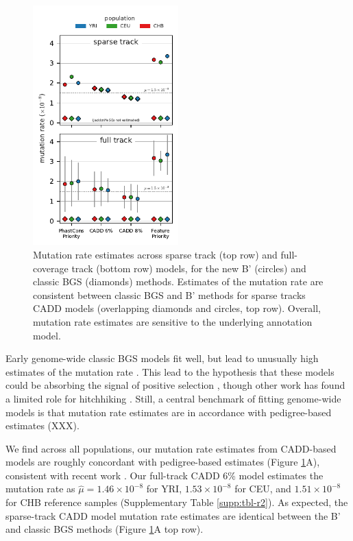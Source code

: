 \documentclass[11pt]{article}
\begin{document}
\begin{figure}[htbp] 
    \centering
    \includegraphics[width=0.5\textwidth]{figures/figure_5.pdf} 
    
    \caption{Mutation rate estimates across sparse track (top row) and
        full-coverage track (bottom row) models, for the new B' (circles) and
        classic BGS (diamonds) methods. Estimates of the mutation rate are
        consistent between classic BGS and B' methods for sparse tracks CADD
        models (overlapping diamonds and circles, top row). Overall, mutation
        rate estimates are sensitive to the underlying annotation model.}
  \label{fig:figure-4}
\end{figure}

Early genome-wide classic BGS models fit well, but lead to unusually high
estimates of the mutation rate \parencite{McVicker2009-ax}. This lead to the
hypothesis that these models could be absorbing the signal of positive
selection \parencite{Enard2014-kz}, though other work has found a limited role
for hitchhiking \parencite{Pickrell2009-tt,Hernandez2011-gs,Murphy2022}. Still,
a central benchmark of fitting genome-wide models is that mutation rate
estimates are in accordance with pedigree-based estimates (XXX). 

We find across all populations, our mutation rate estimates from CADD-based
models are roughly concordant with pedigree-based estimates (Figure
\ref{fig:figure-4}A), consistent with recent work \parencite{Murphy2022-sj}.
Our full-track CADD 6\% model estimates the mutation rate as $\widehat{\mu} =
1.46 \times 10^{-8}$ for YRI, $1.53 \times 10^{-8}$ for CEU, and $1.51 \times
10^{-8}$ for CHB reference samples (Supplementary Table \ref{supp:tbl-r2}). As
expected, the sparse-track CADD model mutation rate estimates are identical
between the B' and classic BGS methods (Figure \ref{fig:figure-4}A top row).
\end{document}
